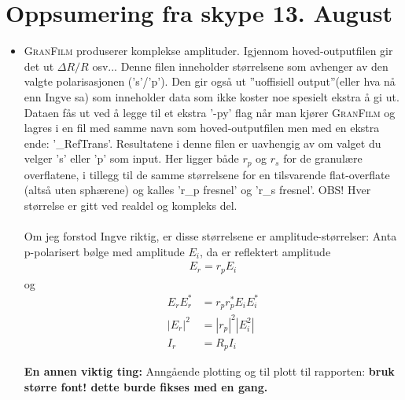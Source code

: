 \section{Oppsumering fra skype 13. August}
\begin{itemize}
\item
\textsc{GranFilm} produserer komplekse amplituder. Igjennom hoved-outputfilen gir det ut 
$\Delta R/R$ osv... Denne filen inneholder størrelsene som avhenger av den valgte polarisasjonen ('s'/'p').
Den gir også ut ''uoffisiell output''(eller hva nå enn Ingve sa) som inneholder data
som ikke koster noe spesielt ekstra å gi ut. Dataen fås ut ved å legge til et ekstra '-py' flag når 
man kjører \textsc{GranFilm} og lagres i en fil med samme navn som hoved-outputfilen men med en ekstra 
ende: '\_RefTrans'. Resultatene i denne filen er uavhengig av om valget du velger 's' eller 
'p' som input. Her ligger både $r_p$ og $r_s$ for de granulære overflatene, i tillegg til 
de samme størrelsene for en tilsvarende flat-overflate (altså uten sphærene) og kalles  
'r\_p fresnel' og 'r\_s fresnel'. OBS! Hver størrelse er gitt ved realdel og kompleks del.
\\
\\
Om jeg forstod Ingve riktig, er
disse størrelsene er amplitude-størrelser: Anta p-polarisert bølge med amplitude $E_i$, da er reflektert 
amplitude
\begin{align*}
E_r = r_p E_i
\end{align*}
og 
\begin{align*}
   E_r E_r^* &= r_p r_p^* E_i E_i^* \\
   |E_r|^2 &= |r_p|^2 |E_i^2|\\
   I_r &= R_p I_i
\end{align*}

\textbf{En annen viktig ting:} Anngående plotting og til plott til rapporten: 
\textbf{bruk større font! dette burde fikses med en gang.}



\end{itemize}
